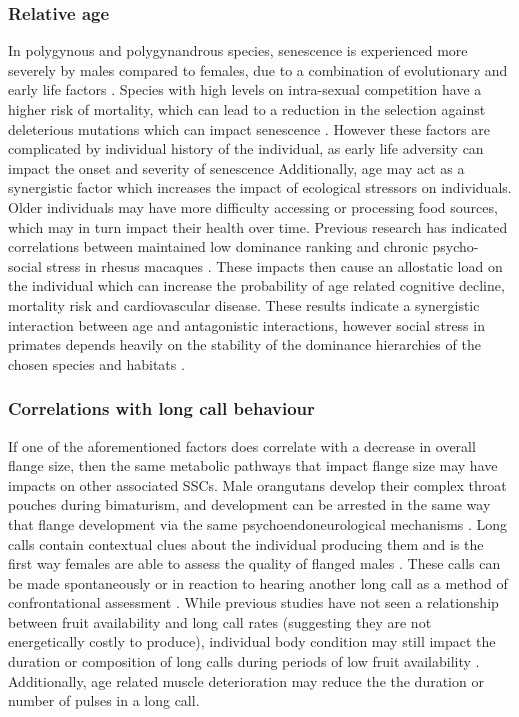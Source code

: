 \subsubsection{Relative age}
In polygynous and polygynandrous species, senescence is experienced more severely by males compared to females, due to a combination of evolutionary and early life factors \citep{Graves.2007}. Species with high levels on intra-sexual competition have a higher risk of mortality, which can lead to a reduction in the selection against deleterious mutations which can impact senescence \citep{Williams.1957}. However these factors are complicated by individual history of the individual, as early life adversity can impact the onset and severity of senescence \citep{Beirne.2015} Additionally, age may act as a synergistic factor which increases the impact of ecological stressors on individuals. Older individuals may have more difficulty accessing or processing food sources, which may in turn impact their health over time. Previous research has indicated correlations between maintained low dominance ranking and chronic psycho-social stress in rhesus macaques \citep{Maestripieri.2011}. These impacts then cause an allostatic load on the individual which can increase the probability of age related cognitive decline, mortality risk and cardiovascular disease. These results indicate a synergistic interaction between age and antagonistic interactions, however social stress in primates depends heavily on the stability of the dominance hierarchies of the chosen species and habitats \citep{Czoty.2009, Mendonça-Furtado.2014, Muller.2004}. 


\subsubsection{Correlations with long call behaviour}
If one of the aforementioned factors does correlate with a decrease in overall flange size, then the same metabolic pathways that impact flange size may have impacts on other associated SSCs. Male orangutans develop their complex throat pouches during bimaturism, and development can be arrested in the same way that flange development via the same psychoendoneurological mechanisms \citep{Prasetyo.2021}. Long calls contain contextual clues about the individual producing them and is the first way females are able to assess the quality of flanged males \citep{Spillmann.2010}. These calls can be made spontaneously or in reaction to hearing another long call as a method of confrontational assessment \citep{Spillmann.2016}. While previous studies have not seen a relationship between fruit availability and long call rates (suggesting they are not energetically costly to produce), individual body condition may still impact the duration or composition of long calls during periods of low fruit availability \citep{Spillmann.2016}. Additionally, age related muscle deterioration may reduce the the duration or number of pulses in a long call.

